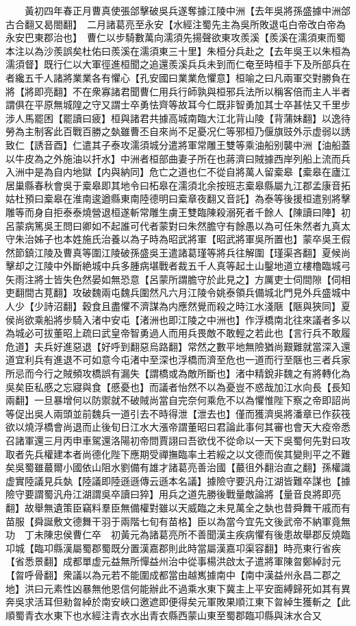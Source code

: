 　　黃初四年春正月曹真使張郃擊破吳兵遂奪據江陵中洲【去年吳將孫盛據中洲郃古合翻又曷閤翻】　二月諸葛亮至永安【水經注蜀先主為吳所敗退屯白帝改白帝為永安巴東郡治也】　曹仁以步騎數萬向濡須先揚聲欲東攻羨溪【羨溪在濡須東而蜀本注以為沙羨誤矣杜佑曰羨溪在濡須東三十里】朱桓分兵赴之【去年吳王以朱桓為濡須督】既行仁以大軍徑進桓聞之追還羨溪兵兵未到而仁奄至時桓手下及所部兵在者纔五千人諸將業業各有懼心【孔安國曰業業危懼意】桓喻之曰凡兩軍交對勝負在將【將即亮翻】不在衆寡諸君聞曹仁用兵行師孰與桓邪兵法所以稱客倍而主人半者謂俱在平原無城隍之守又謂士卒勇怯齊等故耳今仁既非智勇加其士卒甚怯又千里步涉人馬罷困【罷讀曰疲】桓與諸君共據高城南臨大江北背山陵【背蒲妹翻】以逸待勞為主制客此百戰百勝之埶雖曹丕自來尚不足憂况仁等邪桓乃偃旗豉外示虚弱以誘致仁【誘音酉】仁遣其子泰攻濡須城分遣將軍常雕王雙等乘油船别襲中洲【油船蓋以牛皮為之外施油以扞水】中洲者桓部曲妻子所在也蔣濟曰賊據西岸列船上流而兵入洲中是為自内地獄【内與納同】危亡之道也仁不從自將萬人留槖皋【槖皋在廬江居巢縣春秋會吳于槖皋即其地令曰柘皋在濡須北余按班志槖皋縣屬九江郡孟康音拓姑杜預曰槖皋在淮南逡遒縣東南陸德明曰槖章夜翻又音託】為泰等後援桓遣别將擊雕等而身自拒泰泰燒營退桓遂斬常雕生虜王雙臨陳殺溺死者千餘人【陳讀曰陣】初呂蒙病篤吳王問曰卿如不起誰可代者蒙對曰朱然膽守有餘愚以為可任朱然者九真太守朱治姊子也本姓施氏治養以為子時為昭武將軍【昭武將軍吳所置也】蒙卒吳王假然節鎮江陵及曹真等圍江陵破孫盛吳王遣諸葛瑾等將兵往解圍【瑾渠吝翻】夏候尚擊却之江陵中外斷絶城中兵多腫病堪戰者裁五千人真等起土山鑿地道立樓櫓臨城弓矢雨注將士皆失色然晏如無恐意【呂蒙所謂膽守於此見之】方厲吏士伺間隙【伺相吏翻間古莧翻】攻破魏兩屯魏兵圍然凡六月江陵令姚泰領兵備城北門見外兵盛城中人少【少詩沼翻】穀食且盡懼不濟謀為内應然覺而殺之時江水淺陿【陿與狹同】夏侯尚欲乘船將步騎入渚中安屯【渚洲也即江陵之中洲也】作浮橋南北往來議者多以為城必可拔董昭上疏曰武皇帝智勇過人而用兵畏敵不敢輕之若此也【言行兵不敢履危道】夫兵好進惡退【好呼到翻惡烏路翻】常然之數平地無險猶尚艱難就當深入還道宜利兵有進退不可如意今屯渚中至深也浮橋而濟至危也一道而行至陿也三者兵家所忌而今行之賊頻攻橋誤有漏失【謂橋或為敵所斷也】渚中精銳非魏之有將轉化為吳矣臣私慼之忘寢與食【慼憂也】而議者怡然不以為憂豈不惑哉加江水向長【長知兩翻】一旦暴增何以防禦就不破賊尚當自完奈何乘危不以為懼惟陛下察之帝即詔尚等促出吳人兩頭並前魏兵一道引去不時得泄【泄去也】僅而獲濟吳將潘章已作荻筏欲以燒浮橋會尚退而止後旬日江水大漲帝謂董昭曰君論此事何其審也會天大疫帝悉召諸軍還三月丙申車駕還洛陽初帝問賈詡曰吾欲伐不從命以一天下吳蜀何先對曰攻取者先兵權建本者尚德化陛下應期受禪撫臨率土若綏之以文德而俟其變則平之不難矣吳蜀雖蕞爾小國依山阻水劉備有雄才諸葛亮善治國【蕞徂外翻治直之翻】孫權識虚實陸議見兵埶【陸議即陸遜遜傳云遜本名議】據險守要汎舟江湖皆難卒謀也【據險守要謂蜀汎舟江湖謂吳卒讀曰猝】用兵之道先勝後戰量敵論將【量音良將即亮翻】故舉無遺策臣竊料羣臣無備權對雖以天威臨之未見萬全之埶也昔舜舞干戚而有苗服【舜誕敷文德舞干羽于兩階七旬有苗格】臣以為當今宜先文後武帝不納軍竟無功　丁未陳忠侯曹仁卒　初黃元為諸葛亮所不善聞漢主疾病懼有後患故舉郡反燒臨卭城【臨卭縣漢屬蜀郡蜀既分置漢嘉郡則此時當屬漢嘉卭渠容翻】時亮東行省疾【省悉景翻】成都單虚元益無所憚益州治中從事楊洪啟太子遣將軍陳曶鄭綽討元【曶呼骨翻】衆議以為元若不能圍成都當由越嶲據南中【南中漢益州永昌二郡之地】洪曰元素性凶暴無他恩信何能辦此不過乘水東下冀主上平安面縛歸死如其有異奔吳求活耳但勑曶綽於南安峽口邀遮即便得矣元軍敗果順江東下曶綽生獲斬之【此順蜀青衣水東下也水經注青衣水出青衣縣西蒙山東至蜀郡臨卭縣與沫水合又